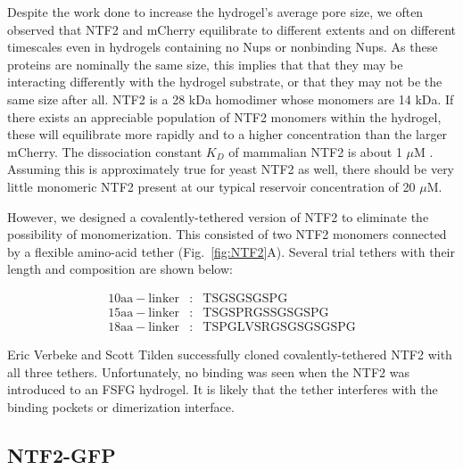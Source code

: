 Despite the work done to increase the hydrogel's average pore size, we often observed that NTF2 and mCherry equilibrate to different extents and on different timescales even in hydrogels containing no Nups or nonbinding Nups.  As these proteins are nominally the same size, this implies that that they may be interacting differently with the hydrogel substrate, or that they may not be the same size after all. NTF2 is a 28 kDa homodimer whose monomers are 14 kDa.  If there exists an appreciable population of NTF2 monomers within the hydrogel, these will equilibrate more rapidly and to a higher concentration than the larger mCherry.  The dissociation constant $K_D$ of mammalian NTF2 is about 1 $\mu$M \cite{chaillan-huntington01}.  Assuming this is approximately true for yeast NTF2 as well, there should be very little monomeric NTF2 present at our typical reservoir concentration of 20 $\mu$M.

However, we designed a covalently-tethered version of NTF2 to eliminate the possibility of monomerization.  This consisted of two NTF2 monomers connected by a flexible amino-acid tether (Fig.~\ref{fig:NTF2}A).  Several trial tethers with their length and composition are shown below:

\begin{align*}
\mathrm{10aa-linker}&:&\mathrm{TSGSGSGSPG}\\
\mathrm{15aa-linker}&:&\mathrm{TSGSPRGSSGSGSPG}\\
\mathrm{18aa-linker}&:&\mathrm{TSPGLVSRGSGSGSGSPG}
\end{align*}

Eric Verbeke and Scott Tilden successfully cloned covalently-tethered NTF2 with all three tethers.  Unfortunately, no binding was seen when the NTF2 was introduced to an FSFG hydrogel.  It is likely that the tether interferes with the binding pockets or dimerization interface.

\subsection{NTF2-GFP}

